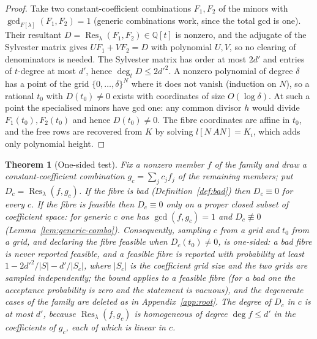 \documentclass[journal]{IEEEtran}
\theoremstyle{plainn}
\newtheorem{thm}{Theorem}
\theoremstyle{remark}
\begin{document}
\begin{proof}
Take two constant-coefficient combinations $F_1,F_2$ of the minors with
$\gcd_{F[\lambda]}(F_1,F_2)=1$ (generic combinations work, since the total gcd is one). Their
resultant $D=\operatorname{Res}_\lambda(F_1,F_2)\in\mathbb Q[t]$ is nonzero, and the adjugate of the
Sylvester matrix gives $UF_1+VF_2=D$ with polynomial $U,V$, so no clearing of denominators is
needed. The Sylvester matrix has order at most $2d'$ and entries of $t$-degree at most $d'$, hence
$\deg_t D\le 2d'^{2}$. A nonzero polynomial of degree $\delta$ has a point of the grid
$\{0,\dots,\delta\}^{N}$ where it does not vanish (induction on $N$), so a rational $t_0$ with
$D(t_0)\ne0$ exists with coordinates of size $O(\log\delta)$. At such a point the specialised minors
have gcd one: any common divisor $h$ would divide $F_1(t_0),F_2(t_0)$ and hence $D(t_0)\ne0$. The
fibre coordinates are affine in $t_0$, and the free rows are recovered from $K$ by solving
$l[N\ AN]=K_i$, which adds only polynomial height.
\end{proof}

\begin{thm}[One-sided test]\label{thm:rp}
Fix a nonzero member $f$ of the family and draw a constant-coefficient combination
$g_c=\sum_j c_jf_j$ of the remaining members; put $D_c=\operatorname{Res}_\lambda(f,g_c)$. If the fibre is bad (Definition~\ref{def:bad}) then $D_c\equiv0$ for every $c$. If the fibre is feasible then $D_c\equiv0$ only on a proper closed subset of coefficient space: for
generic $c$ one has $\gcd(f,g_c)=1$ and $D_c\not\equiv0$ (Lemma~\ref{lem:generic-combo}). Consequently, sampling $c$ from a grid and $t_0$ from a grid, and declaring the fibre feasible when
$D_c(t_0)\ne0$, is one-sided: a bad fibre is never reported feasible, and a feasible fibre is reported
with probability at least $1-2d'^{2}/|S|-d'/|S_c|$, where $|S_c|$ is the coefficient grid size and the
two grids are sampled \emph{independently}; the bound applies to a feasible fibre (for a bad one the
acceptance probability is zero and the statement is vacuous), and the degenerate cases of the family are
deleted as in Appendix~\ref{app:root}. The degree of $D_c$ in $c$ is at most $d'$, because $\operatorname{Res}_\lambda(f,g_c)$ is homogeneous of
degree $\deg f\le d'$ in the coefficients of $g_c$, each of which is linear in $c$.
\end{thm}
\end{document}
